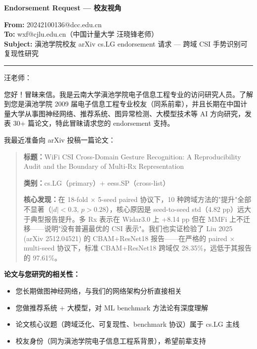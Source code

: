 \documentclass[11pt]{article}
\begin{document}
\begin{center}
\Large\bfseries Endorsement Request --- 校友视角
\end{center}

\vspace{0.3cm}

\noindent\textbf{From:} 20242100136@dcc.edu.cn \\
\textbf{To:} wxf@cjlu.edu.cn（中国计量大学 汪晓锋老师） \\
\textbf{Subject:} 滇池学院校友 arXiv cs.LG endorsement 请求 --- 跨域 CSI 手势识别可复现性研究

\vspace{0.3cm}
\hrule
\vspace{0.3cm}

\noindent 汪老师：

您好！冒昧来信。我是云南大学滇池学院电子信息工程专业的访问研究人员。了解到您是滇池学院 2009 届电子信息工程专业校友（同系前辈），并且长期在中国计量大学从事图神经网络、推荐系统、图异常检测、大模型技术等 AI 方向研究，发表 30+ 篇论文，特此冒昧请求您的 endorsement 支持。

\vspace{0.2cm}

\noindent 我最近准备向 arXiv 投稿一篇论文：

\begin{quote}
\textbf{标题：}WiFi CSI Cross-Domain Gesture Recognition: A Reproducibility Audit and the Boundary of Multi-Rx Representation

\textbf{类别：}cs.LG（primary）+ eess.SP（cross-list）

\textbf{核心发现：}在 18-fold × 5-seed paired 协议下，10 种跨域方法的"提升"全部不显著（$|d|<0.3$, $p>0.28$），核心原因是 seed-to-seed std（4.82 pp）远大于典型报告提升。多 Rx 表示在 Widar3.0 上 +8.14 pp 但在 MMFi 上不迁移——说明"没有普遍最优的 CSI 表示"。我们也实证检验了 Liu 2025 (arXiv 2512.04521) 的 CBAM+ResNet18 报告——在严格的 paired × multi-seed 协议下，标准 CBAM+ResNet18 跨域仅 28.35\%，远低于其报告的 97.61\%。
\end{quote}

\vspace{0.2cm}

\noindent\textbf{论文与您研究的相关性：}
\begin{itemize}
\item 您长期做图神经网络，与我们的网络架构分析直接相关
\item 您做推荐系统 + 大模型，对 ML benchmark 方法论有深度理解
\item 论文核心议题（跨域泛化、可复现性、benchmark 协议）属于 cs.LG 主线
\item 校友身份（同为滇池学院电子信息工程系背景），希望前辈支持
\end{itemize}
\end{document}
